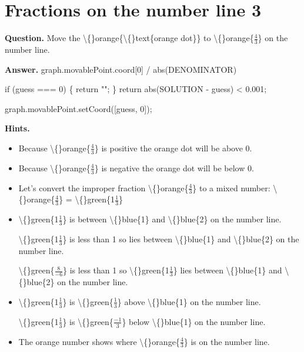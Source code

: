 \documentclass{article}
\begin{document}
\section*{Fractions on the number line 3}
\textbf{Question.} Move the \textbackslash\{\}orange\{\textbackslash\{\}text\{orange dot\}\} to
                \textbackslash\{\}orange\{$\frac{4}{3}$\} on the number line.

\textbf{Answer.} graph.movablePoint.coord[0] / abs(DENOMINATOR)
                
                    if (guess === 0) \{
                        return "";
                    \}
                    return abs(SOLUTION - guess) < 0.001;
                
                
                    graph.movablePoint.setCoord([guess, 0]);

\textbf{Hints.}
\begin{itemize}
  \item Because \textbackslash\{\}orange\{$\frac{4}{3}$\} is positive the orange dot will be above 0.
  \item Because \textbackslash\{\}orange\{$\frac{4}{3}$\} is negative the orange dot will be below 0.
  \item Let's convert the improper fraction \textbackslash\{\}orange\{$\frac{4}{3}$\} to a mixed number:
            \textbackslash\{\}orange\{$\frac{4}{3}$\} = \textbackslash\{\}green\{1$\frac{1}{3}$\}
  \item \textbackslash\{\}green\{1$\frac{1}{3}$\} is between
                \textbackslash\{\}blue\{1\} and \textbackslash\{\}blue\{2\} on the number line.
            
            
                \textbackslash\{\}green\{1$\frac{1}{3}$\} is less than 1 so lies between
                \textbackslash\{\}blue\{1\} and \textbackslash\{\}blue\{2\} on the number line.
            
            
                \textbackslash\{\}green\{$\frac{8}{-6}$\} is less than 1
                so \textbackslash\{\}green\{1$\frac{1}{3}$\} lies between \textbackslash\{\}blue\{1\}
                and \textbackslash\{\}blue\{2\} on the number line.
  \item \textbackslash\{\}green\{1$\frac{1}{3}$\} is \textbackslash\{\}green\{$\frac{1}{3}$\}
                    above \textbackslash\{\}blue\{1\} on the number line.
                
                    \textbackslash\{\}green\{1$\frac{1}{3}$\} is \textbackslash\{\}green\{$\frac{-1}{3}$\}
                    below \textbackslash\{\}blue\{1\} on the number line.
  \item The orange number shows where \textbackslash\{\}orange\{$\frac{4}{3}$\} is on the number line.
\end{itemize}
\end{document}
